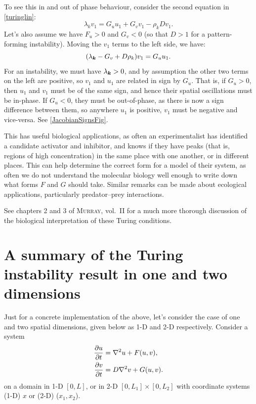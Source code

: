\documentclass[main.tex]{subfiles}
\begin{document}
To see this in and out of phase behaviour, consider the second equation in \cref{turinglin}:
\begin{equation}
    \lambda_k v_1 = G_u u_1 + G_v v_1 - \rho_k D v_1.
\end{equation} Let's also assume we have $F_u>0$ and $G_v<0$ (so that $D>1$ for a pattern-forming instability). Moving the $v_1$ terms to the left side, we have:
$$
(\lambda_\v{k} - G_v + D \rho_k)v_1 = G_u u_1.
$$
For an instability, we must have $\lambda_\v{k}>0$, and by assumption the other two terms on the left are positive, so $v_1$ and $u_1$ are related in sign by $G_u$. That is, if $G_u>0$, then $u_1$ and $v_1$ must be of the same sign, and hence their spatial oscillations must be in-phase. If $G_u<0$, they must be out-of-phase, as there is now a sign difference between them, so anywhere $u_1$ is positive, $v_1$ must be negative and vice-versa. See \cref{JacobianSignsFig}.

This has useful biological applications, as often an experimentalist has identified a candidate activator and inhibitor, and knows if they have peaks (that is, regions of high concentration) in the same place with one another, or in different places. This can help determine the correct form for a model of their system, as often we do not understand the molecular biology well enough to write down what forms $F$ and $G$ should take. Similar remarks can be made about ecological applications, particularly predator--prey interactions. 

\begin{extra-reading}
See chapters 2 and 3 of \textsc{Murray}, vol.~II for a much more thorough discussion of the biological interpretation of these Turing conditions.
\end{extra-reading}



\section{A summary of the Turing instability result in one and two dimensions}
Just for a concrete implementation of the above, let's consider the case of one and two spatial dimensions, given below as 1-D and 2-D respectively. Consider a system 
\begin{align}
\label{tsys}
\pd{u}{t} &= \nabla^2u +  F(u,v),\\
\pd{v}{t} &= D\nabla^2v +  G(u,v).
\end{align}
on a domain in 1-D $[0,L]$, or in 2-D $[0,L_1]\times[0,L_2]$ with coordinate systems (1-D) $x$ or (2-D) ($x_1,x_2$).
\end{document}
